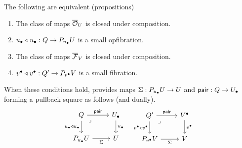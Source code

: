 \begin{theorem}\label{thm:sigma-equiv-defs}
  The following are equivalent (propositions)
  \begin{enumerate}
    \item The class of maps ${\overline{{\mathcal{O}}}}_U$ is closed under composition.
    \item ${u_\bullet} \triangleleft {u_\bullet} : Q \to P_{u_\bullet} U$ is a small opfibration.
    \item The class of maps ${\overline{{\mathcal{F}}}}_V$ is closed under composition.
    \item ${v^\bullet} \triangleleft {v^\bullet} : Q' \to P_{v^\bullet} V$ is a small fibration.
  \end{enumerate}
  When these conditions hold,
   provides maps
  $\Sigma : P_{u_\bullet} U \to U$
  and $\mathsf{pair} : Q \to {U_\bullet}$ forming a pullback square as follows (and dually).
  \begin{equation}\label{eq:fib-algebraic-sigma}
    \begin{tikzcd}
      Q & \Ulow \\
      {P_\ulow \U} & \U
      \arrow["{\pair}", from=1-1, to=1-2]
      \arrow["{{\ulow \pcomp \ulow}}"', from=1-1, to=2-1]
      \arrow["\lrcorner"{anchor=center, pos=0.125}, draw=none, from=1-1, to=2-2]
      \arrow["\ulow", from=1-2, to=2-2]
      \arrow["{\Sigma}"', from=2-1, to=2-2]
    \end{tikzcd}
    \quad 
    \begin{tikzcd}
      Q' & \Vlow \\
      {P_\vlow \V} & \V
      \arrow["\pair", from=1-1, to=1-2]
      \arrow["{{\vlow \pcomp \vlow}}"', from=1-1, to=2-1]
      \arrow["\lrcorner"{anchor=center, pos=0.125}, draw=none, from=1-1, to=2-2]
      \arrow["\vlow", from=1-2, to=2-2]
      \arrow["\Sigma"', from=2-1, to=2-2]
    \end{tikzcd}
  \end{equation}
\end{theorem}
